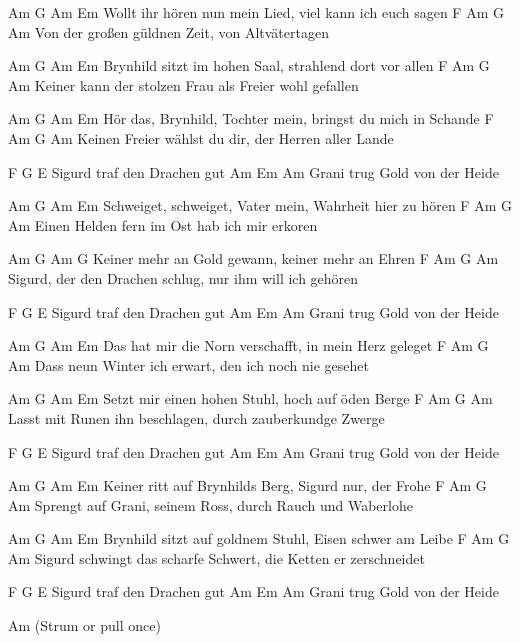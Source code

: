 Am              G        Am                       Em
Wollt ihr hören nun mein Lied, viel kann ich euch sagen
F              Am            G           Am
Von der großen güldnen Zeit, von Altvätertagen

Am                G            Am                Em
Brynhild sitzt im hohen Saal, strahlend dort vor allen
F                Am               G             Am
Keiner kann der stolzen Frau als Freier wohl gefallen

Am                 G       Am                       Em
Hör das, Brynhild, Tochter mein, bringst du mich in Schande
F              Am                G            Am
Keinen Freier wählst du dir, der Herren aller Lande


F               G       E
Sigurd traf den Drachen gut
Am                      Em Am
Grani trug Gold von der Heide

Am                    G     Am                     Em
Schweiget, schweiget, Vater mein, Wahrheit hier zu hören
F            Am          G              Am
Einen Helden fern im Ost hab ich mir erkoren

Am             G      Am                   G
Keiner mehr an Gold gewann, keiner mehr an Ehren
F               Am                  G              Am
Sigurd, der den Drachen schlug, nur ihm will ich gehören

F               G       E
Sigurd traf den Drachen gut
Am                      Em Am
Grani trug Gold von der Heide

Am              G        Am                      Em
Das hat mir die Norn verschafft, in mein Herz geleget
F                Am              G             Am
Dass neun Winter ich erwart, den ich noch nie gesehet

Am              G     Am                   Em
Setzt mir einen hohen Stuhl, hoch auf öden Berge
F               Am                    G            Am
Lasst mit Runen ihn beschlagen, durch zauberkundge Zwerge

F               G       E
Sigurd traf den Drachen gut
Am                      Em Am
Grani trug Gold von der Heide

Am              G         Am                    Em
Keiner ritt auf Brynhilds Berg, Sigurd nur, der Frohe
F                  Am                 G         Am
Sprengt auf Grani, seinem Ross, durch Rauch und Waberlohe

Am                 G       Am                     Em
Brynhild sitzt auf goldnem Stuhl, Eisen schwer am Leibe
F                    Am                  G               Am
Sigurd schwingt das scharfe Schwert, die Ketten er zerschneidet

F               G       E
Sigurd traf den Drachen gut
Am                      Em Am
Grani trug Gold von der Heide

Am (Strum or pull once)
